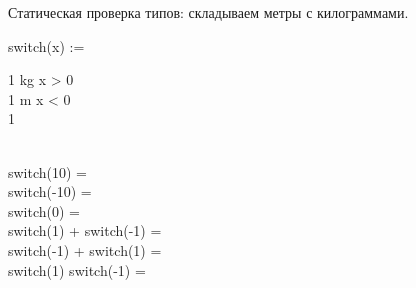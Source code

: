%
%
%
%
%
%



    Статическая проверка типов: складываем метры с килограммами.

    \begin{preproc}

        switch(x) := \begin{caseblock}
                         1 \cdot kg \when x > 0 \\
                         1 \cdot m \when x < 0 \\
                         1 \otherwise
        \end{caseblock} \\

        switch(10) =  \\
        switch(-10) =  \\
        switch(0) =  \\
        switch(1) + switch(-1) =  \\
        switch(-1) + switch(1) =  \\
        switch(1) \cdot switch(-1) =  \\

    \end{preproc}



